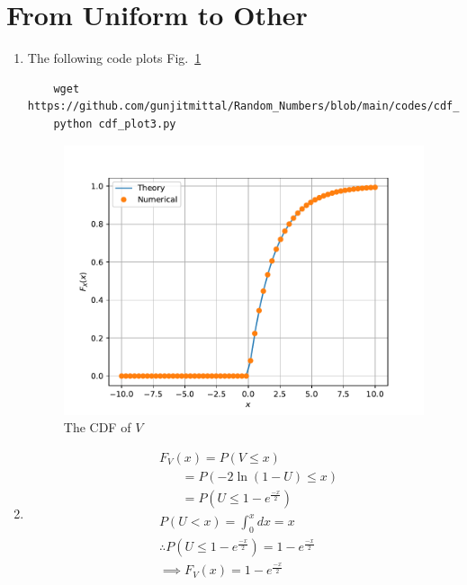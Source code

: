\documentclass[journal,12pt,twocolumn]{IEEEtran}
\renewcommand\thesection{\arabic{section}}
\begin{document}
    \section{From Uniform to Other}
    \begin{enumerate}[label=\thesection.\arabic*,ref=\thesection.\theenumi]
    \item \solution{}
    The following code plots Fig.~\ref{fig:V_cdf}
    \begin{lstlisting}
    wget https://github.com/gunjitmittal/Random_Numbers/blob/main/codes/cdf_plot3.py
    python cdf_plot3.py
    \end{lstlisting}
    \begin{figure}[h]
        \centering
        \includegraphics[width=\columnwidth]{../figs/V_cdf}
        \caption{The CDF of $V$}\label{fig:V_cdf}
        \end{figure}
    \item \begin{align}
        &F_{V}(x)=P(V \leq x)\\
        &~~~~~~~~=P(-2 \ln (1-U) \leq x)\\
        &~~~~~~~~=P(U \leq 1-e^{\frac{-x}{2}})\\
        &P(U<x)=\int_{0}^{x} dx=x\\
        &\therefore P(U \leq 1-e^{\frac{-x}{2}})=1-e^{\frac{-x}{2}} \\ 
        &\implies F_{V}(x) = 1-e^{\frac{-x}{2}}
        \end{align}
    \end{enumerate}
    
\end{document}
